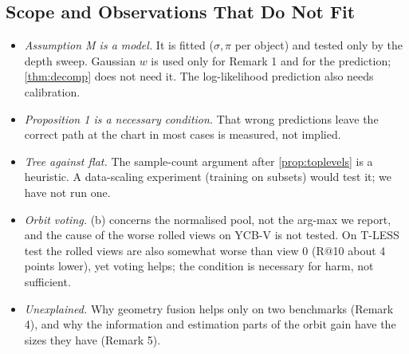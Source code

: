 \subsection{Scope and Observations That Do Not Fit}
\begin{itemize}
\item \emph{Assumption M is a model.} It is fitted ($\sigma,\pi$ per object) and tested only by the depth sweep. Gaussian $w$ is
used only for Remark 1 and for the prediction; \cref{thm:decomp} does not need it. The log-likelihood prediction also needs calibration.
\item \emph{Proposition 1 is a necessary condition.} That wrong predictions leave the correct path at the chart in most cases is
measured, not implied.
\item \emph{Tree against flat.} The sample-count argument after \cref{prop:toplevels} is a heuristic. A data-scaling experiment
(training on subsets) would test it; we have not run one.
\item \emph{Orbit voting.} (b) concerns the normalised pool, not the arg-max we report, and the cause of the
worse rolled views on YCB-V is not tested. On T-LESS test the rolled views are also somewhat worse than view 0 (R@10 about 4
points lower), yet voting helps; the condition is necessary for harm, not sufficient.
\item \emph{Unexplained.} Why geometry fusion helps only on two benchmarks (Remark 4), and why the information and estimation parts of the
orbit gain have the sizes they have (Remark 5).
\end{itemize}
